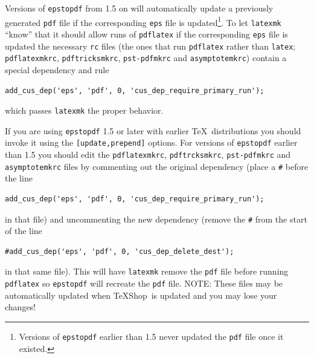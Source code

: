 \documentclass[11pt]{article}
\newcommand{\TS}{\textsf{\TeX Shop}}
\begin{document}
Versions of \texttt{epstopdf} from 1.5 on will automatically update a previously generated \texttt{pdf} file if the corresponding \texttt{eps} file is updated\footnote{Versions of \texttt{epstopdf} earlier than 1.5 never updated the \texttt{pdf} file once it existed.}. To let \texttt{latexmk} ``know'' that it should allow runs of \texttt{pdflatex} if the corresponding \texttt{eps} file is updated the necessary \texttt{rc} files (the ones that run \texttt{pdflatex} rather than \texttt{latex}; \texttt{pdflatexmkrc}, \texttt{pdftricksmkrc}, \texttt{pst-pdfmkrc} and \texttt{asymptotemkrc}) contain a special dependency and rule
\begin{verbatim}
add_cus_dep('eps', 'pdf', 0, 'cus_dep_require_primary_run');
\end{verbatim}
which passes \texttt{latexmk} the proper behavior.

If you are using \texttt{epstopdf} 1.5 or later with earlier \TeX\ distributions you should invoke it using the \texttt{[update,prepend]} options. For versions of \texttt{epstopdf} earlier than 1.5 you should edit the \texttt{pdflatexmkrc}, \texttt{pdftrcksmkrc}, \texttt{pst-pdfmkrc} and \texttt{asymptotemkrc} files by commenting out the original dependency (place a \texttt{\#} before the line
\begin{verbatim}
add_cus_dep('eps', 'pdf', 0, 'cus_dep_require_primary_run');
\end{verbatim}
in that file) and uncommenting the new dependency (remove the \texttt{\#} from the start of the line
\begin{verbatim}
#add_cus_dep('eps', 'pdf', 0, 'cus_dep_delete_dest');
\end{verbatim}
in that same file). This will have \texttt{latexmk} remove the \texttt{pdf} file before running \texttt{pdflatex} so \texttt{epstopdf} will recreate the \texttt{pdf} file. NOTE: These files may be automatically updated when \TS\ is updated and you may lose your changes!
\end{document}
